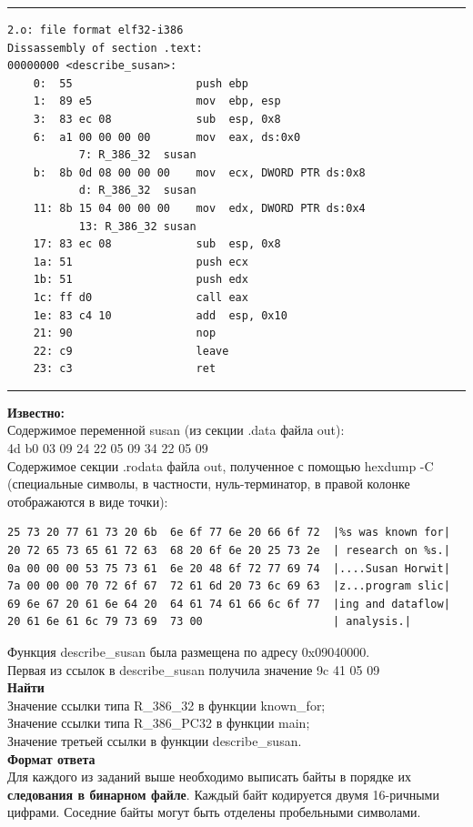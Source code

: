 \documentclass[12pt, letterpaper]{article}
\begin{document}
\hrule
\begin{verbatim}
2.o: file format elf32-i386
Dissassembly of section .text:
00000000 <describe_susan>:
    0:  55                   push ebp
    1:  89 e5                mov  ebp, esp
    3:  83 ec 08             sub  esp, 0x8
    6:  a1 00 00 00 00       mov  eax, ds:0x0
           7: R_386_32  susan    
    b:  8b 0d 08 00 00 00    mov  ecx, DWORD PTR ds:0x8
           d: R_386_32  susan
    11: 8b 15 04 00 00 00    mov  edx, DWORD PTR ds:0x4
           13: R_386_32 susan
    17: 83 ec 08             sub  esp, 0x8
    1a: 51                   push ecx
    1b: 51                   push edx
    1c: ff d0                call eax
    1e: 83 c4 10             add  esp, 0x10
    21: 90                   nop
    22: c9                   leave
    23: c3                   ret
\end{verbatim}
\hrule
\textbf{Известно:}\\
Содержимое переменной susan (из секции .data файла out):\\
4d b0 03 09 24 22 05 09 34 22 05 09\\
Содержимое секции .rodata файла out, полученное с помощью hexdump -C (специальные символы, в частности, нуль-терминатор, в правой колонке отображаются в виде точки):\\
\begin{verbatim}
25 73 20 77 61 73 20 6b  6e 6f 77 6e 20 66 6f 72  |%s was known for|
20 72 65 73 65 61 72 63  68 20 6f 6e 20 25 73 2e  | research on %s.|
0a 00 00 00 53 75 73 61  6e 20 48 6f 72 77 69 74  |....Susan Horwit|
7a 00 00 00 70 72 6f 67  72 61 6d 20 73 6c 69 63  |z...program slic|
69 6e 67 20 61 6e 64 20  64 61 74 61 66 6c 6f 77  |ing and dataflow|
20 61 6e 61 6c 79 73 69  73 00                    | analysis.|
\end{verbatim}
Функция describe\_susan была размещена по адресу 0x09040000.\\
Первая из ссылок в describe\_susan получила значение 9c 41 05 09\\
\textbf{Найти}\\
Значение ссылки типа R\_386\_32 в функции known\_for;\\
Значение ссылки типа R\_386\_PC32 в функции main;\\
Значение третьей ссылки в функции describe\_susan.\\
\textbf{Формат ответа}\\
Для каждого из заданий выше необходимо выписать байты в порядке их \textbf{следования в бинарном файле}. Каждый байт кодируется двумя 16-ричными цифрами. Соседние байты могут быть отделены пробельными символами.
\newpage
\end{document}

